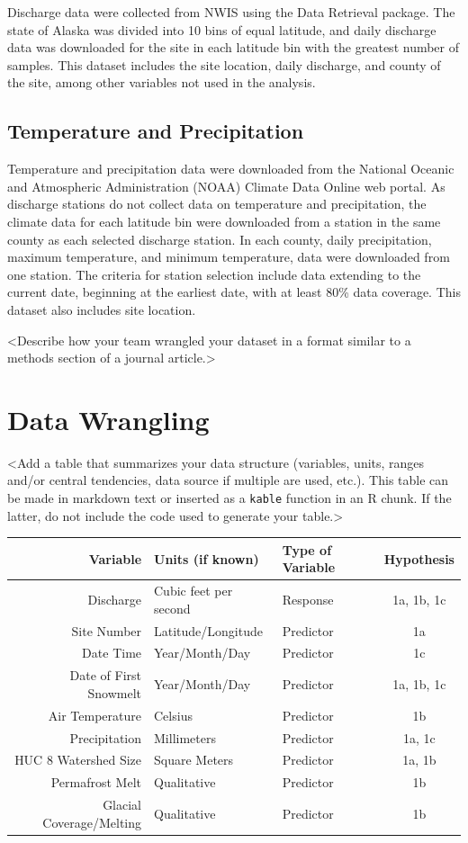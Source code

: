 \documentclass[12pt,]{article}
\begin{document}
Discharge data were collected from NWIS using the Data Retrieval
package. The state of Alaska was divided into 10 bins of equal latitude,
and daily discharge data was downloaded for the site in each latitude
bin with the greatest number of samples. This dataset includes the site
location, daily discharge, and county of the site, among other variables
not used in the analysis.

\hypertarget{temperature-and-precipitation}{%
\subsection{Temperature and
Precipitation}\label{temperature-and-precipitation}}

Temperature and precipitation data were downloaded from the National
Oceanic and Atmospheric Administration (NOAA) Climate Data Online web
portal. As discharge stations do not collect data on temperature and
precipitation, the climate data for each latitude bin were downloaded
from a station in the same county as each selected discharge station. In
each county, daily precipitation, maximum temperature, and minimum
temperature, data were downloaded from one station. The criteria for
station selection include data extending to the current date, beginning
at the earliest date, with at least 80\% data coverage. This dataset
also includes site location.

\textless{}Describe how your team wrangled your dataset in a format
similar to a methods section of a journal article.\textgreater{}

\newpage

\hypertarget{data-wrangling}{%
\section{Data Wrangling}\label{data-wrangling}}

\textless{}Add a table that summarizes your data structure (variables,
units, ranges and/or central tendencies, data source if multiple are
used, etc.). This table can be made in markdown text or inserted as a
\texttt{kable} function in an R chunk. If the latter, do not include the
code used to generate your table.\textgreater{}

\begin{longtable}[]{@{}rllc@{}}
\toprule
Variable & Units (if known) & Type of Variable &
Hypothesis\tabularnewline
\midrule
\endhead
Discharge & Cubic feet per second & Response & 1a, 1b, 1c\tabularnewline
Site Number & Latitude/Longitude & Predictor & 1a\tabularnewline
Date Time & Year/Month/Day & Predictor & 1c\tabularnewline
Date of First Snowmelt & Year/Month/Day & Predictor & 1a, 1b,
1c\tabularnewline
Air Temperature & Celsius & Predictor & 1b\tabularnewline
Precipitation & Millimeters & Predictor & 1a, 1c\tabularnewline
HUC 8 Watershed Size & Square Meters & Predictor & 1a, 1b\tabularnewline
Permafrost Melt & Qualitative & Predictor & 1b\tabularnewline
Glacial Coverage/Melting & Qualitative & Predictor & 1b\tabularnewline
\bottomrule
\end{longtable}
\end{document}
